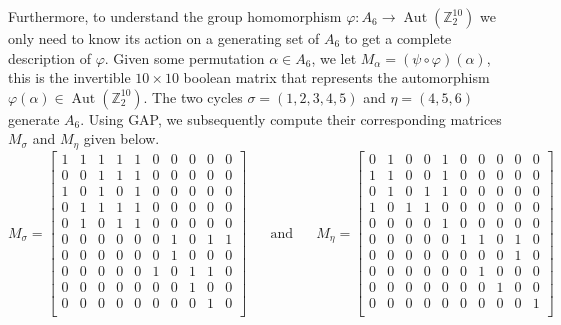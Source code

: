 \documentclass[11pt,twoside]{amsart}
\DeclareMathOperator{\Aut}{Aut}
\newcommand{\Z}{\mathbb{Z}}
\numberwithin{equation}{section}
\begin{document}
Furthermore, to understand the group homomorphism $\varphi:A_6 \to \Aut(\Z_2^{10})$ we only need to know its action on a generating set of $A_6$ to get a complete description of $\varphi$. Given some permutation $\alpha \in A_6$, we let $M_\alpha=(\psi\circ \varphi)(\alpha)$,  this is the invertible $10\times 10$ boolean matrix that represents the automorphism $\varphi(\alpha)\in\Aut(\Z_2^{10})$. The two cycles  $\sigma = (1,2,3,4,5)$ and $\eta = (4,5,6)$ generate $A_6$. Using GAP, we subsequently compute their corresponding matrices $M_\sigma$ and $M_\eta$ given below.
\[   
    M_\sigma = 
    \begin{bmatrix}
    	1 & 1 & 1 & 1 & 1 & 0 & 0 & 0 & 0 & 0 \\
            0 & 0 & 1 & 1 & 1 & 0 & 0 & 0 & 0 & 0 \\
            1 & 0 & 1 & 0 & 1 & 0 & 0 & 0 & 0 & 0 \\
            0 & 1 & 1 & 1 & 1 & 0 & 0 & 0 & 0 & 0 \\
            0 & 1 & 0 & 1 & 1 & 0 & 0 & 0 & 0 & 0 \\
            0 & 0 & 0 & 0 & 0 & 0 & 1 & 0 & 1 & 1 \\
            0 & 0 & 0 & 0 & 0 & 0 & 1 & 0 & 0 & 0 \\
            0 & 0 & 0 & 0 & 0 & 1 & 0 & 1 & 1 & 0 \\
            0 & 0 & 0 & 0 & 0 & 0 & 0 & 1 & 0 & 0 \\
            0 & 0 & 0 & 0 & 0 & 0 & 0 & 0 & 1 & 0 \\
    \end{bmatrix}
     \text{ ~~~ and ~~~ }
    M_\eta = 
    \begin{bmatrix}
    	0 & 1 & 0 & 0 & 1 & 0 & 0 & 0 & 0 & 0 \\
            1 & 1 & 0 & 0 & 1 & 0 & 0 & 0 & 0 & 0 \\
            0 & 1 & 0 & 1 & 1 & 0 & 0 & 0 & 0 & 0 \\
            1 & 0 & 1 & 1 & 0 & 0 & 0 & 0 & 0 & 0 \\
            0 & 0 & 0 & 0 & 1 & 0 & 0 & 0 & 0 & 0 \\
            0 & 0 & 0 & 0 & 0 & 1 & 1 & 0 & 1 & 0 \\
            0 & 0 & 0 & 0 & 0 & 0 & 0 & 0 & 1 & 0 \\
            0 & 0 & 0 & 0 & 0 & 0 & 1 & 0 & 0 & 0 \\
            0 & 0 & 0 & 0 & 0 & 0 & 0 & 1 & 0 & 0 \\
            0 & 0 & 0 & 0 & 0 & 0 & 0 & 0 & 0 & 1 \\
    \end{bmatrix}
    \label{matrices_gens}
\]
\end{document}
